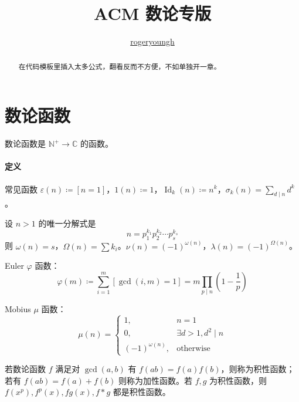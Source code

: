 \documentclass{proart}
\title{ACM 数论专版}
\author{\href{https://github.com/rogeryoungh}{rogeryoungh}}
\begin{document}
\newcommand\mfrac[2]{\dfrac{#1\smash[b]{\strut}}{#2\smash[t]{\strut}}}
\newcommand{\RR}{\mathbb{R}}
\newcommand{\NN}{\mathbb{N}}
\newcommand{\QQ}{\mathbb{Q}}
\newcommand{\ZZ}{\mathbb{Z}}
\newcommand{\PP}{\mathbb{P}}
\newcommand{\ee}{\mathrm{e}}
\newcommand{\dd}{\mathrm{d}}
\newcommand{\uppi}{\mathrm{\pi}}
\newcommand{\eps}{\varepsilon}

\newcommand{\lcm}{\operatorname{lcm}}
\newcommand{\DFT}{\operatorname{DFT}_{\omega_n}}
\newcommand{\Id}{\operatorname{Id}}

\newcommand{\num}[1]{{\fzfs{（}}{\rm{#1}}{\fzfs{）}}}

\maketitle

\tableofcontents

\begin{abstract}
    在代码模板里插入太多公式，翻看反而不方便，不如单独开一章。
\end{abstract}

\section{数论函数}

数论函数是 $\mathbb{N}^+ \to \mathbb{C}$ 的函数。

\paragraph{定义}
常见函数 $\varepsilon(n) \coloneqq [n=1]$，$1(n) \coloneqq 1$，$\Id_k(n) \coloneqq n^k$，$\sigma_k(n) = \sum\limits_{d \mid n} d^k$。

设 $n > 1$ 的唯一分解式是
\[ n = p_1^{k_1}p_2^{k_2}\cdots p_s^{k_s} \]
则 $\omega(n) = s$，$\Omega(n) = \sum k_i$。$\nu(n) = (-1)^{\omega(n)}$，$\lambda(n) = (-1)^{\Omega(n)}$。

Euler $\varphi$ 函数：
\[ \varphi(m) \coloneqq \sum_{i=1}^m [\gcd(i,m) = 1] = m \prod_{p \mid n}\left( 1-\frac{1}{p} \right) \]

Mobius $\mu$ 函数：
\[ \mu(n) = \begin{cases}
    1, &n=1\\
    0, &\exists d > 1, d^2 \mid n\\
    (-1)^{\omega(n)}, &\text{otherwise}
\end{cases} \]

若数论函数 $f$ 满足对 $\gcd(a,b)$ 有 $f(ab) = f(a)f(b)$，则称为积性函数；若有 $f(ab) = f(a) + f(b)$ 则称为加性函数。若 $f,g$ 为积性函数，则 $f(x^p),f^p(x),fg(x),f \ast g$ 都是积性函数。
\end{document}
